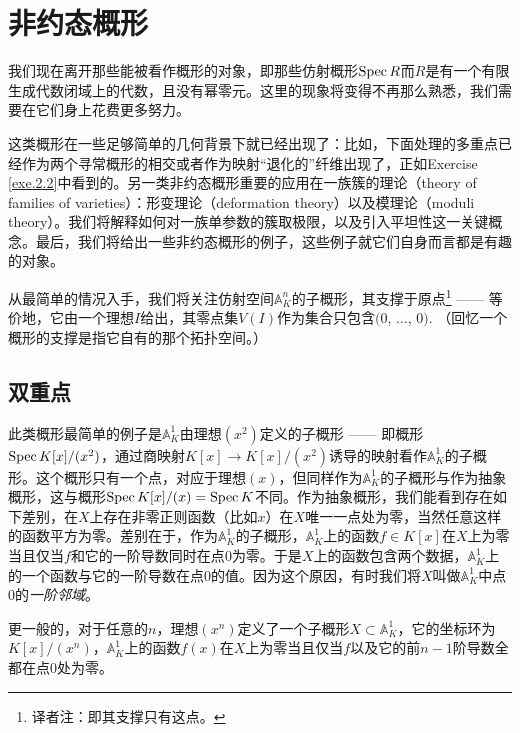\section{非约态概形}

我们现在离开那些能被看作概形的对象，即那些仿射概形$\operatorname{Spec} R$而$R$是有一个有限生成代数闭域上的代数，且没有幂零元。这里的现象将变得不再那么熟悉，我们需要在它们身上花费更多努力。

这类概形在一些足够简单的几何背景下就已经出现了：比如，下面处理的多重点已经作为两个寻常概形的相交或者作为映射“退化的”纤维出现了，正如Exercise \ref{exe.2.2}中看到的。另一类非约态概形重要的应用在一族簇的理论（theory of families of varieties）：形变理论（deformation theory）以及模理论（moduli theory）。我们将解释如何对一族单参数的簇取极限，以及引入平坦性这一关键概念。最后，我们将给出一些非约态概形的例子，这些例子就它们自身而言都是有趣的对象。

从最简单的情况入手，我们将关注仿射空间$\mathbb{A}_K^n$的子概形，其支撑于原点\footnote{译者注：即其支撑只有这点。} ------ 等价地，它由一个理想$I$给出，其零点集$V(I)$作为集合只包含$(0$, $\dots$, $0)$. （回忆一个概形的支撑是指它自有的那个拓扑空间。）

\subsection{双重点}\label{s.2.3.1}
\begin{exa}
	此类概形最简单的例子是$\mathbb{A}_K^1$由理想$(x^2)$定义的子概形 ------ 即概形$\operatorname{Spec} K[x]/(x^2)$，通过商映射$K[x]\to K[x]/(x^2)$诱导的映射看作$\mathbb{A}_K^1$的子概形。这个概形只有一个点，对应于理想$(x)$，但同样作为$\mathbb{A}_K^1$的子概形与作为抽象概形，这与概形$\operatorname{Spec} K[x]/(x)=\operatorname{Spec} K$不同。作为抽象概形，我们能看到存在如下差别，在$X$上存在非零正则函数（比如$x$）在$X$唯一一点处为零，当然任意这样的函数平方为零。差别在于，作为$\mathbb{A}_K^1$的子概形，$\mathbb{A}_K^1$上的函数$f\in K[x]$在$X$上为零当且仅当$f$和它的一阶导数同时在点$0$为零。于是$X$上的函数包含两个数据，$\mathbb{A}_K^1$上的一个函数与它的一阶导数在点$0$的值。因为这个原因，有时我们将$X$叫做$\mathbb{A}_K^1$中点$0$的\textit{一阶邻域}。
\end{exa}

更一般的，对于任意的$n$，理想$(x^n)$定义了一个子概形$X\subset \mathbb{A}_K^1$，它的坐标环为$K[x]/(x^n)$，$\mathbb{A}_K^1$上的函数$f(x)$在$X$上为零当且仅当$f$以及它的前$n-1$阶导数全都在点$0$处为零。

